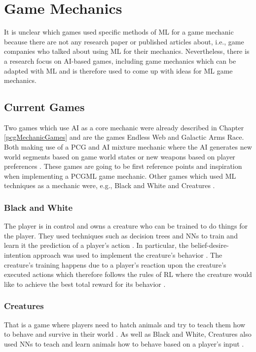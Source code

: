 \documentclass[MGS,Master,english]{twbook}%
\begin{document}
\section{Game Mechanics}
It is unclear which games used specific methods of \ac{ML} for a game mechanic because there are not any research paper or published articles about, i.e., game companies who talked about using \ac{ML} for their mechanics. Nevertheless, there is a research focus on \ac{AI}-based games, including game mechanics which can be adapted with \ac{ML} and is therefore used to come up with ideas for \ac{ML} game mechanics. 

\subsection{Current Games}
Two games which use \ac{AI} as a core mechanic were already described in Chapter \ref{pcgMechanicGames} and are the games Endless Web and Galactic Arms Race. Both making use of a \ac{PCG} and \ac{AI} mixture mechanic where the \ac{AI} generates new world segments based on game world states \cite{pcg::endlessWeb} or new weapons based on player preferences \cite{pcg::galacticArmsRace}. These games are going to be first reference points and inspiration when implementing a \ac{PCGML} game mechanic. Other games which used \ac{ML} techniques as a mechanic were, e.g., Black and White and Creatures \cite{ml::mostInfluentalAiGames}. 

\subsubsection{Black and White}
The player is in control and owns a creature who can be trained to do things for the player. They used techniques such as decision trees and \acp{NN} to train and learn it the prediction of a player's action \cite{ml::gamasutra::ml} \cite{ml::mostInfluentalAiGames}. In particular, the belief-desire-intention approach was used to implement the creature's behavior \cite{ml::mostInfluentalAiGames}. The creature's training happens due to a player’s reaction upon the creature's executed actions which therefore follows the rules of \ac{RL} where the creature would like to achieve the best total reward for its behavior \cite{ml::gamasutra::ml}.

\subsubsection{Creatures}
That is a game where players need to hatch animals and try to teach them how to behave and survive in their world \cite{ml::mostInfluentalAiGames}. As well as Black and White, Creatures also used \acp{NN} to teach and learn animals how to behave based on a player's input \cite{ml::mostInfluentalAiGames}.
\end{document}
